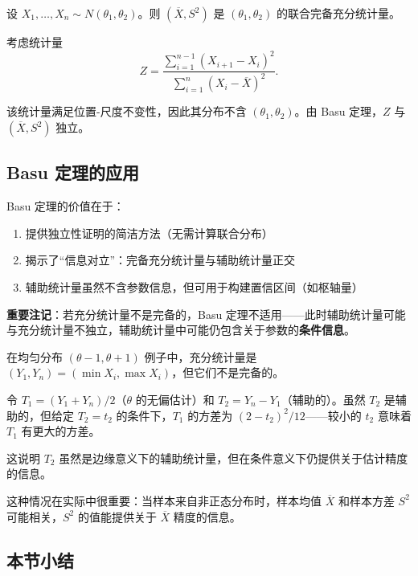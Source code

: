 \begin{example}\label{ex:normal-joint-independent}
设 $X_1, \ldots, X_n \sim N(\theta_1, \theta_2)$。则 $(\overline{X}, S^2)$ 是 $(\theta_1, \theta_2)$ 的联合完备充分统计量。

考虑统计量
\[
Z = \frac{\sum_{i=1}^{n-1}(X_{i+1} - X_i)^2}{\sum_{i=1}^n (X_i - \overline{X})^2}.
\]

该统计量满足位置-尺度不变性，因此其分布不含 $(\theta_1, \theta_2)$。由 Basu 定理，$Z$ 与 $(\overline{X}, S^2)$ 独立。
\end{example}

\subsection{Basu 定理的应用}

Basu 定理的价值在于：
\begin{enumerate}
\item 提供独立性证明的简洁方法（无需计算联合分布）
\item 揭示了``信息对立''：完备充分统计量与辅助统计量正交
\item 辅助统计量虽然不含参数信息，但可用于构建置信区间（如枢轴量）
\end{enumerate}

\textbf{重要注记}：若充分统计量不是完备的，Basu 定理不适用——此时辅助统计量可能与充分统计量不独立，辅助统计量中可能仍包含关于参数的\textbf{条件信息}。

\begin{example}[非完备情况下的条件信息]\label{ex:noncomplete-conditional}
在均匀分布 $(\theta-1, \theta+1)$ 例子中，充分统计量是 $(Y_1, Y_n) = (\min X_i, \max X_i)$，但它们不是完备的。

令 $T_1 = (Y_1+Y_n)/2$（$\theta$ 的无偏估计）和 $T_2 = Y_n - Y_1$（辅助的）。虽然 $T_2$ 是辅助的，但给定 $T_2 = t_2$ 的条件下，$T_1$ 的方差为 $(2-t_2)^2/12$——较小的 $t_2$ 意味着 $T_1$ 有更大的方差。

这说明 $T_2$ 虽然是边缘意义下的辅助统计量，但在条件意义下仍提供关于估计精度的信息。
\end{example}

这种情况在实际中很重要：当样本来自非正态分布时，样本均值 $\overline{X}$ 和样本方差 $S^2$ 可能相关，$S^2$ 的值能提供关于 $\overline{X}$ 精度的信息。

\subsection*{本节小结}

